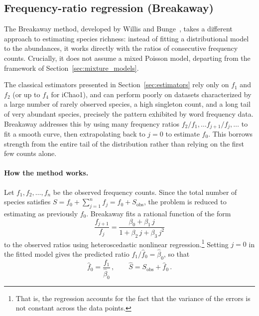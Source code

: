 ﻿\documentclass{article}
\begin{document}
\subsection{Frequency-ratio regression (Breakaway)}\label{sec:breakaway}

The Breakaway method, developed by Willis and Bunge~\cite{willisbunge2015}, takes a different approach to estimating species richness: instead of fitting a distributional model to the abundances, it works directly with the ratios of consecutive frequency counts. Crucially, it does not assume a mixed Poisson model, departing from the framework of Section~\ref{sec:mixture_models}.

The classical estimators presented in Section~\ref{sec:estimators} rely only on $f_1$ and $f_2$ (or up to $f_4$ for iChao1), and can perform poorly on datasets characterized by a large number of rarely observed species, a high singleton count, and a long tail of very abundant species, precisely the pattern exhibited by word frequency data. Breakaway addresses this by using many frequency ratios $f_2/f_1, \ldots f_{j+1}/f_{j}, \ldots$ to fit a smooth curve, then extrapolating back to $j = 0$ to estimate $f_0$. This borrows strength from the entire tail of the distribution rather than relying on the first few counts alone.

\paragraph{How the method works.}
Let $f_1, f_2, \ldots, f_n$ be the observed frequency counts. Since the total number of species satisfies $S = f_0 + \sum_{j=1}^{n} f_j = f_0 + S_{\mathrm{obs}}$, the problem is reduced to estimating as previously $f_0$. Breakaway fits a rational function of the form
\begin{equation}\label{eq:breakaway_ratio}
    \frac{f_{j+1}}{f_j} = \frac{\beta_0 + \beta_1 \, j}{1 + \beta_2 
    \, j + \beta_3 \, j^2}
\end{equation}
to the observed ratios using heteroscedastic nonlinear regression.\footnote{That is, the regression accounts for the fact that the variance of the errors is not constant across the data points.} Setting $j = 0$ in the fitted model gives the predicted ratio $f_1 / \hat{f}_0 = \hat{\beta}_0$, so that
\begin{equation}\label{eq:breakaway_f0}
    \hat{f}_0 = \frac{f_1}{\hat{\beta}_0}\,, \qquad
    \hat{S} = S_{\mathrm{obs}} + \hat{f}_0\,.
\end{equation}
\end{document}
